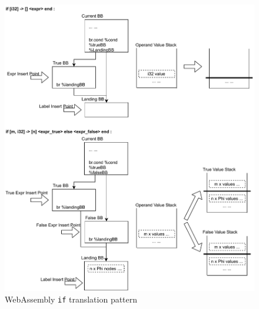 \begin{figure}
  \centering
  \includegraphics[width=\textwidth]{Images/4.MIR/translate-if.pdf}
  \caption{WebAssembly \texttt{if} translation pattern}
  \label{fig:translate-if}
\end{figure} 

